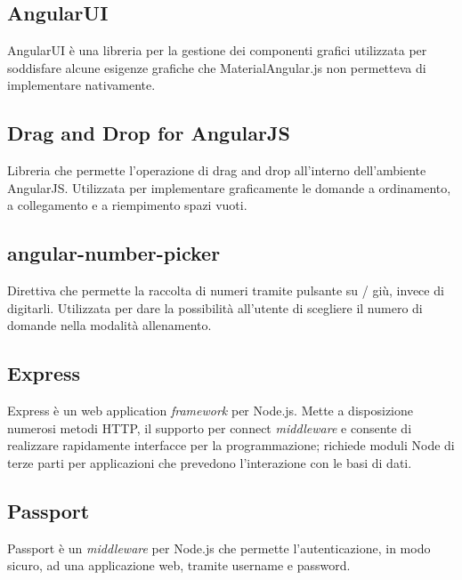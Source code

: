 \subsection{AngularUI}
AngularUI è una libreria per la gestione dei componenti grafici utilizzata per soddisfare alcune esigenze grafiche che MaterialAngular.js non permetteva di implementare nativamente.
\subsection{Drag and Drop for AngularJS}
Libreria che permette l'operazione di drag and drop all'interno dell'ambiente AngularJS. Utilizzata per implementare graficamente le domande a ordinamento, a collegamento e a riempimento spazi vuoti.
\subsection{angular-number-picker}
Direttiva che permette la raccolta di numeri tramite pulsante su / giù, invece di digitarli. Utilizzata per dare la possibilità all'utente di scegliere il numero di domande nella modalità allenamento.
\subsection{Express}
Express è un web application \textit{framework} per Node.js. Mette a disposizione numerosi metodi HTTP, il supporto per connect \textit{middleware} e consente di realizzare rapidamente interfacce per la programmazione; richiede moduli Node di terze parti per applicazioni che prevedono l'interazione con le basi di dati.
\subsection{Passport}
Passport è un \textit{middleware} per Node.js che permette l'autenticazione, in modo sicuro, ad una applicazione web, tramite username e password. 